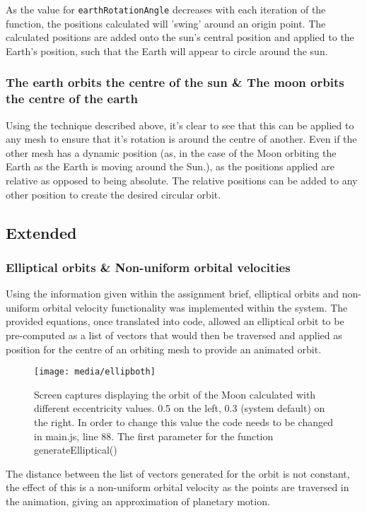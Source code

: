 \documentclass[titlepage]{article}
\begin{document}
As the value for \texttt{earthRotationAngle} decreases with each iteration of the function, the positions calculated will 'swing' around an origin point. The calculated positions are added onto the sun's central position and applied to the Earth's position, such that the Earth will appear to circle around the sun.

\subsubsection{The earth orbits the centre of the sun \& The moon orbits the centre of the earth}
Using the technique described above, it's clear to see that this can be applied to any mesh to ensure that it's rotation is around the centre of another. Even if the other mesh has a dynamic position (as, in the case of the Moon orbiting the Earth as the Earth is moving around the Sun.), as the positions applied are relative as opposed to being absolute. The relative positions can be added to any other position to create the desired circular orbit.
 

\subsection{Extended}
\subsubsection{Elliptical orbits \& Non-uniform orbital velocities}
Using the information given within the assignment brief, elliptical orbits and non-uniform orbital velocity functionality was implemented within the system. The provided equations, once translated into code, allowed an elliptical orbit to be pre-computed as a list of vectors that would then be traversed and applied as position for the centre of an orbiting mesh to provide an animated orbit.


\begin{figure}[h!]
                \centering
                \texttt{[image: media/ellipboth]}
                \caption{Screen captures displaying the orbit of the Moon calculated with different eccentricity values. 0.5 on the left, 0.3 (system default) on the right. In order to change this value the code needs to be changed in main.js, line 88. The first parameter for the function generateElliptical()}
            \end{figure}
\FloatBarrier
The distance between the list of vectors generated for the orbit is not constant, the effect of this is a non-uniform orbital velocity as the points are traversed in the animation, giving an approximation of planetary motion.
\end{document}
